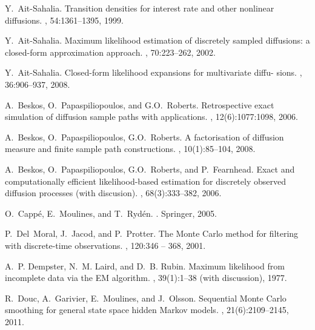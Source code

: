 \documentclass[12pt]{article}
\newcommand{\1}{\mathrm{1}}
\begin{document}

%
\begin{thebibliography}{10}

Y.~Ait-Sahalia.
\newblock Transition densities for interest rate and other nonlinear
  diffusions.
, 54:1361--1395, 1999.

Y.~Ait-Sahalia.
\newblock Maximum likelihood estimation of discretely sampled diffusions: a
  closed-form approximation approach.
, 70:223--262, 2002.

Y.~Ait-Sahalia.
\newblock Closed-form likelihood expansions for multivariate diffu- sions.
, 36:906--937, 2008.

A.~Beskos,  O.~Papaspiliopoulos, and G.O.~Roberts.
\newblock Retrospective exact simulation of diffusion sample paths with applications.
, 12(6):1077:1098, 2006.

A.~Beskos, O.~Papaspiliopoulos, G.O.~Roberts.
\newblock A factorisation of diffusion measure and finite sample path constructions.
, 10(1):85--104, 2008.

A.~Beskos, O.~Papaspiliopoulos, G.O.~Roberts, and P.~Fearnhead.
\newblock Exact and computationally efficient likelihood-based estimation for
  discretely observed diffusion processes (with discusion).
, 68(3):333--382, 2006.

O.~Capp\'{e}, E.~Moulines, and T.~Ryd\'{e}n.
.
\newblock Springer, 2005.

P.~Del~Moral, J.~Jacod, and P.~Protter.
\newblock The {M}onte {C}arlo method for filtering with discrete-time
  observations.
, 120:346 -- 368,
  2001.

A.~P. Dempster, N.~M. Laird, and D.~B. Rubin.
\newblock Maximum likelihood from incomplete data via the {EM} algorithm.
, 39(1):1--38 (with discussion), 1977.

R.~Douc, A.~Garivier, E.~Moulines, and J.~Olsson.
\newblock Sequential {M}onte {C}arlo smoothing for general state space hidden
  {M}arkov models.
, 21(6):2109--2145, 2011.


\end{thebibliography}
\end{document}
